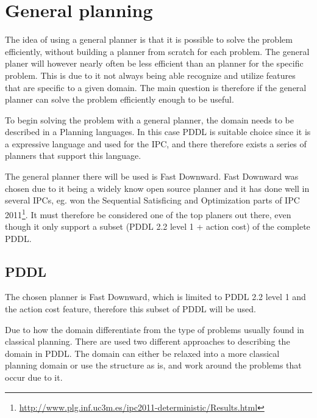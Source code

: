 \chapter{General planning}
	The idea of using a general planner is that it is possible to solve the problem efficiently, without building a planner from scratch for each problem. The general planer will however nearly often be less efficient than an planner for the specific problem. This is due to it not always being able recognize and utilize features that are specific to a given domain. The main question is therefore if the general planner can solve the problem efficiently enough to be useful.

	To begin solving the problem with a general planner, the domain needs to be described in a Planning languages. In this case PDDL is suitable choice since it is a expressive language and used for the IPC, and there therefore exists a series of planners that support this language.
 
	  
	
	The general planner there will be used is Fast Downward. Fast Downward was chosen due to it being a widely know open source planner and it has done well in several IPCs, eg. won the Sequential Satisficing and Optimization parts of IPC 2011\footnote{\url{http://www.plg.inf.uc3m.es/ipc2011-deterministic/Results.html}}. It must therefore be considered one of the top planers out there, even though it only support a subset (PDDL 2.2 level 1 + action cost) of the complete PDDL.
 
 \section{PDDL}

	The chosen planner is Fast Downward, which is limited to PDDL 2.2 level 1 and the action cost feature, therefore this subset of PDDL will be used.

	Due to how the domain differentiate from the type of problems usually found in classical planning. There are used two different approaches to describing the domain in PDDL. The domain can either be relaxed into a more classical planning domain or use the structure as is, and work around the problems that occur due to it.
	
